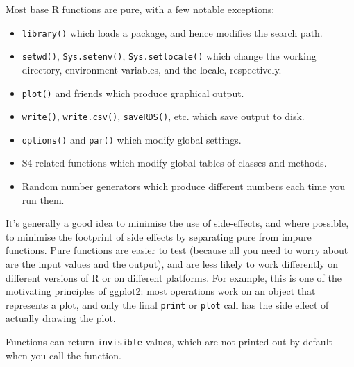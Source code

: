 Most base R functions are pure, with a few notable exceptions:

\begin{itemize}
\item
  \texttt{library()} which loads a package, and hence modifies the
  search path.
\item
  \texttt{setwd()}, \texttt{Sys.setenv()}, \texttt{Sys.setlocale()}
  which change the working directory, environment variables, and the
  locale, respectively.
\item
  \texttt{plot()} and friends which produce graphical output.
\item
  \texttt{write()}, \texttt{write.csv()}, \texttt{saveRDS()}, etc. which
  save output to disk.
\item
  \texttt{options()} and \texttt{par()} which modify global settings.
\item
  S4 related functions which modify global tables of classes and
  methods.
\item
  Random number generators which produce different numbers each time you
  run them.
\end{itemize}

It's generally a good idea to minimise the use of side-effects, and
where possible, to minimise the footprint of side effects by separating
pure from impure functions. Pure functions are easier to test (because
all you need to worry about are the input values and the output), and
are less likely to work differently on different versions of R or on
different platforms. For example, this is one of the motivating
principles of ggplot2: most operations work on an object that represents
a plot, and only the final \texttt{print} or \texttt{plot} call has the
side effect of actually drawing the plot.

Functions can return \texttt{invisible} values, which are not printed
out by default when you call the function. 

\begin{Shaded}
\begin{Highlighting}[]
\StringTok{ }
\StringTok{ }\NormalTok{(}\NormalTok{)}

\NormalTok{()}
\NormalTok{()}
\NormalTok{() ==}\StringTok{ }
\NormalTok{() ==}\StringTok{ }
\end{Highlighting}
\end{Shaded}

